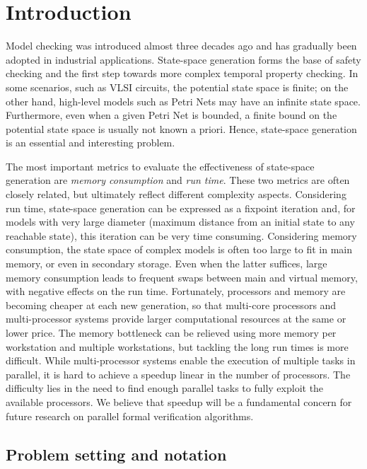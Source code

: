 \documentclass[copyright,creativecommons]{eptcs}
\begin{document}
\section{Introduction}

Model checking was introduced almost three decades ago and has gradually been
adopted in industrial applications.
State-space generation forms the base of safety
checking and the first step towards more complex temporal property checking.
In some scenarios, such as VLSI circuits, the potential state space is finite;
on the other hand, high-level models such as Petri Nets may have an infinite
state space.
Furthermore, even when a given Petri Net is bounded, a finite bound on
the potential state space is usually not known a priori.
Hence, state-space generation is an essential and interesting problem.

The most important metrics to evaluate the effectiveness of state-space
generation are \emph{memory consumption} and \emph{run time}.
These two metrics are often closely related, but ultimately
reflect different complexity aspects.
Considering run time, state-space generation can be expressed as
a fixpoint iteration and, for models with very large diameter
(maximum distance from an initial state to any reachable state),
this iteration can be very time consuming.
Considering memory consumption, the state space of complex models is often
too large to fit in main memory, or even in secondary storage.
Even when the latter suffices, large memory consumption leads to frequent swaps
between main and virtual memory, with negative effects on the run time.
Fortunately, processors and memory are becoming cheaper at each new generation,
so that multi-core processors and multi-processor systems provide larger
computational resources at the same or lower price.
The memory bottleneck can be relieved using more memory per workstation
and multiple workstations, but tackling the long run times is more difficult.
While multi-processor systems enable the execution of multiple
tasks in parallel, it is hard to achieve a speedup linear in the number of
processors.
The difficulty lies in the need to find enough parallel tasks to fully exploit
the available processors.
We believe that speedup will be a fundamental concern for future research on
parallel formal verification algorithms.

\subsection{Problem setting and notation}
\end{document}
